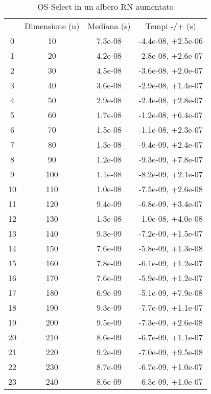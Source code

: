 \begin{table}
\centering
\caption{OS-Select in un albero RN aumentato}
\label{OS-Select in un albero RN aumentato}
\begin{adjustbox}{width=1\textwidth/2}
\begin{tabular}{|c|c|c|c|}
\hline
 & Dimensione (n) & Mediana (s) & Tempi -/+ (s) \\
0 & 10 & 7.3e-08 & -4.4e-08, +2.5e-06 \\
\cline{1-4}
1 & 20 & 4.2e-08 & -2.8e-08, +2.6e-07 \\
\cline{1-4}
2 & 30 & 4.5e-08 & -3.6e-08, +2.0e-07 \\
\cline{1-4}
3 & 40 & 3.6e-08 & -2.9e-08, +1.4e-07 \\
\cline{1-4}
4 & 50 & 2.9e-08 & -2.4e-08, +2.8e-07 \\
\cline{1-4}
5 & 60 & 1.7e-08 & -1.2e-08, +6.4e-07 \\
\cline{1-4}
6 & 70 & 1.5e-08 & -1.1e-08, +2.3e-07 \\
\cline{1-4}
7 & 80 & 1.3e-08 & -9.4e-09, +2.4e-07 \\
\cline{1-4}
8 & 90 & 1.2e-08 & -9.3e-09, +7.8e-07 \\
\cline{1-4}
9 & 100 & 1.1e-08 & -8.2e-09, +2.1e-07 \\
\cline{1-4}
10 & 110 & 1.0e-08 & -7.5e-09, +2.6e-08 \\
\cline{1-4}
11 & 120 & 9.4e-09 & -6.8e-09, +3.4e-07 \\
\cline{1-4}
12 & 130 & 1.3e-08 & -1.0e-08, +4.0e-08 \\
\cline{1-4}
13 & 140 & 9.3e-09 & -7.2e-09, +1.5e-07 \\
\cline{1-4}
14 & 150 & 7.6e-09 & -5.8e-09, +1.3e-08 \\
\cline{1-4}
15 & 160 & 7.8e-09 & -6.1e-09, +1.2e-07 \\
\cline{1-4}
16 & 170 & 7.6e-09 & -5.9e-09, +1.2e-07 \\
\cline{1-4}
17 & 180 & 6.9e-09 & -5.1e-09, +7.9e-08 \\
\cline{1-4}
18 & 190 & 9.3e-09 & -7.7e-09, +1.1e-07 \\
\cline{1-4}
19 & 200 & 9.5e-09 & -7.3e-09, +2.6e-08 \\
\cline{1-4}
20 & 210 & 8.6e-09 & -6.7e-09, +1.1e-07 \\
\cline{1-4}
21 & 220 & 9.2e-09 & -7.0e-09, +9.5e-08 \\
\cline{1-4}
22 & 230 & 8.7e-09 & -6.7e-09, +1.0e-07 \\
\cline{1-4}
23 & 240 & 8.6e-09 & -6.5e-09, +1.0e-07 \\

\end{tabular}
\end{adjustbox}
\end{table}
